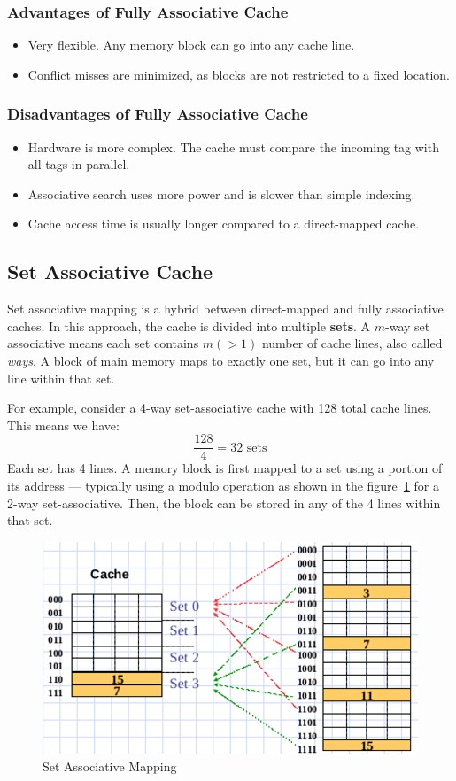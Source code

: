 \documentclass[12pt]{book}
\begin{document}
\subsubsection*{Advantages of Fully Associative Cache}
\begin{itemize}
    \item Very flexible. Any memory block can go into any cache line.
    \item Conflict misses are minimized, as blocks are not restricted to a fixed location.
\end{itemize}

\subsubsection*{Disadvantages of Fully Associative Cache}
\begin{itemize}
    \item Hardware is more complex. The cache must compare the incoming tag with all tags in parallel.
    \item Associative search uses more power and is slower than simple indexing.
    \item Cache access time is usually longer compared to a direct-mapped cache.
\end{itemize}



\subsection*{Set Associative Cache}
\label{sec:set-associative-cache}

Set associative mapping is a hybrid between direct-mapped and fully associative caches. In this approach, the cache is divided into multiple \textbf{sets}. A $m$-way set associative means each set contains $m(>1)$ number of cache lines, also called \textit{ways}. A block of main memory maps to exactly one set, but it can go into any line within that set.

For example, consider a 4-way set-associative cache with 128 total cache lines. This means we have:
\[
\frac{128}{4} = 32 \text{ sets}
\]
Each set has 4 lines. A memory block is first mapped to a set using a portion of its address — typically using a modulo operation as shown in the figure~\ref{fig:set_associative} for a 2-way set-associative. Then, the block can be stored in any of the 4 lines within that set.

\begin{figure}[H]
    \centering
    \includegraphics[width=0.5\linewidth]{images/set_associative.png}
    \caption{Set Associative Mapping}
    \label{fig:set_associative}
\end{figure}
\end{document}
